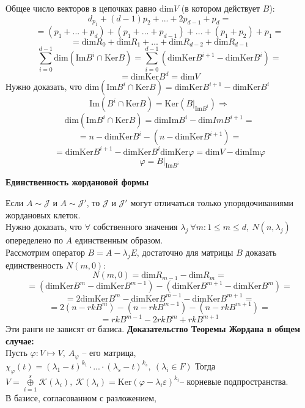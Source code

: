 \documentclass[a4paper, 12pt]{article}
\theoremstyle{definition}
\begin{document}
    Общее число векторов в цепочках равно $\text{dim}V$
    (в котором действует $B$):
    $$d_{p_1} + (d-1)p_2 + ... + 2p_{d-1} + p_d =$$
    $$ =(p_1 +...+ p_d) + (p_1 + ... + p_{d-1}) +...+ (p_1 + p_2)
    + p_1 = $$
    $$= \text{dim}R_0 + \text{dim}R_1 +...+ \text{dim}R_{d-2}
    + \text{dim}R_{d-1}$$
    $$\sum\limits_{i=0}^{d-1}\text{dim}(\text{Im}B^i \cap 
    \text{Ker}B) = \sum\limits_{i=0}^{d-1}(\text{dimKer}B^
    {i+1} - \text{dimKer}B^i) =$$
    $$= \text{dimKer}B^d = \text{dim}V$$
    Нужно доказать, что $\text{dim}(\text{Im}B^i \cap \text{Ker}B) = 
    \text{dimKer}B^{i+1} - \text{dimKer}B^i$
    $$\text{Im}(B^i \cap \text{Ker}B) = \text{Ker}(B|_{\text{Im}B^i}) 
    \Longrightarrow$$ $$\text{dim}(\text{Im}B^i \cap \text{Ker}B) = 
    \text{dimIm}B^i - \text{dim}ImB^{i+1}=$$ $$= n - \text{dimKer}B^i
    - (n - \text{dimKer}B^{i+1})=$$ $$= \text{dimKer}B^{i+1} - 
    \text{dimKer}B^i
    \text{dimKer}\varphi = \text{dim}V - \text{dimIm}\varphi$$
    $$\varphi = B|_{\text{Im}B^i}$$
    \begin{center}
        \textbf{Единственность жордановой формы} 
    \end{center}
    Если $A \sim \mathcal{J} $ и $A \sim \mathcal{J}'$,
    то $\mathcal{J} $ и $\mathcal{J} '$ могут отличаться
    только упорядочиваниями жордановых клеток.\\
    Нужно доказать, что $\forall$ собственного значения $
    \lambda_j\ \forall m: 1 \leq m \leq d,\ N(n,\lambda_j)$  
    опеределено по $A$ единственным образом.\\
    Рассмотрим оператор $B = A - \lambda_j E$, достаточно
    для матрицы $B$ доказать единственность $N(m, 0):$
    $$N(m,0) = \text{dim}R_{m-1} - \text{dim}R_m = $$
    $$=(\text{dimKer}B^m - \text{dimKer}B^{m-1}) - 
    (\text{dimKer}B^{m+1} - \text{dimKer}B^m) = $$
    $$ = 2\text{dimKer}B^m - \text{dimKer}B^{m-1} - \text{dimKer}B^{m+1} =$$
    $$ =2(n - rkB^m) - (n - rkB^{m-1}) - (n - rkB^{m+1}) =$$
    $$=rkB^{m-1} - 2rkB^{m} + rkB^{m+1}$$
    Эти ранги не зависят от базиса.
    \newpage
    \textbf{Доказательство Теоремы Жордана в общем случае:}\\
    Пусть $\varphi: V \longmapsto V,\ A_\varphi$ -- его 
    матрица, $\chi_\varphi(t) = (\lambda_1 - t)^{k_1}\cdot...
    \cdot (\lambda_s - t)^{k_s},\ (\lambda_i \in F)$
    Тогда $V = \overset{s}{\underset{i=1}{\oplus}}\mathcal{K}
    (\lambda_i),\  \mathcal{K}(\lambda_i) = \text{Ker}(    
    \varphi - \lambda_i \varepsilon)^{k_i}$-- корневые
    подпространства.\\
    В базисе, согласованном с разложением,
\end{document}
